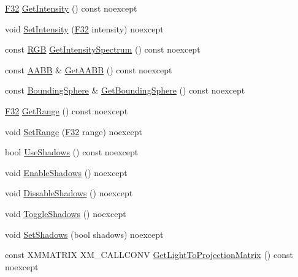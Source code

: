 \begin{DoxyCompactItemize}
\item 
\hyperlink{namespacemage_aa97e833b45f06d60a0a9c4fc22ae02c0}{F32} \hyperlink{classmage_1_1rendering_1_1_omni_light_ada51f74cdcf61ff29049d0a1fdf973c9}{Get\+Intensity} () const noexcept
\item 
void \hyperlink{classmage_1_1rendering_1_1_omni_light_aa2a936678bde1f957fd70207d2460d06}{Set\+Intensity} (\hyperlink{namespacemage_aa97e833b45f06d60a0a9c4fc22ae02c0}{F32} intensity) noexcept
\item 
const \hyperlink{structmage_1_1_r_g_b}{R\+GB} \hyperlink{classmage_1_1rendering_1_1_omni_light_a62247b6d7c2029ab906492049e858538}{Get\+Intensity\+Spectrum} () const noexcept
\item 
const \hyperlink{classmage_1_1_a_a_b_b}{A\+A\+BB} \& \hyperlink{classmage_1_1rendering_1_1_omni_light_aa3408de0d62c39d09e0b5aaccf61406a}{Get\+A\+A\+BB} () const noexcept
\item 
const \hyperlink{classmage_1_1_bounding_sphere}{Bounding\+Sphere} \& \hyperlink{classmage_1_1rendering_1_1_omni_light_aaecee74a14aae5015f8bc738727162ee}{Get\+Bounding\+Sphere} () const noexcept
\item 
\hyperlink{namespacemage_aa97e833b45f06d60a0a9c4fc22ae02c0}{F32} \hyperlink{classmage_1_1rendering_1_1_omni_light_af9bfc4b943b156756cd7c2323d93ebdd}{Get\+Range} () const noexcept
\item 
void \hyperlink{classmage_1_1rendering_1_1_omni_light_a71d9cbef05c421a154b202e7a9b8eedb}{Set\+Range} (\hyperlink{namespacemage_aa97e833b45f06d60a0a9c4fc22ae02c0}{F32} range) noexcept
\item 
bool \hyperlink{classmage_1_1rendering_1_1_omni_light_a7b4bd4cdd980feb3d841fff5947720e9}{Use\+Shadows} () const noexcept
\item 
void \hyperlink{classmage_1_1rendering_1_1_omni_light_a676a457b4e79b7dc74696acc713a9230}{Enable\+Shadows} () noexcept
\item 
void \hyperlink{classmage_1_1rendering_1_1_omni_light_a18eaf3b2683997854827b12ec26c9039}{Dissable\+Shadows} () noexcept
\item 
void \hyperlink{classmage_1_1rendering_1_1_omni_light_aa1816fad8913711c10994b66103279a2}{Toggle\+Shadows} () noexcept
\item 
void \hyperlink{classmage_1_1rendering_1_1_omni_light_a2817ab7a4c514785f01bf2e40c6245cb}{Set\+Shadows} (bool shadows) noexcept
\item 
const X\+M\+M\+A\+T\+R\+IX X\+M\+\_\+\+C\+A\+L\+L\+C\+O\+NV \hyperlink{classmage_1_1rendering_1_1_omni_light_aa93d9722b3480fc9997761af89a6d90d}{Get\+Light\+To\+Projection\+Matrix} () const noexcept
\end{DoxyCompactItemize}
